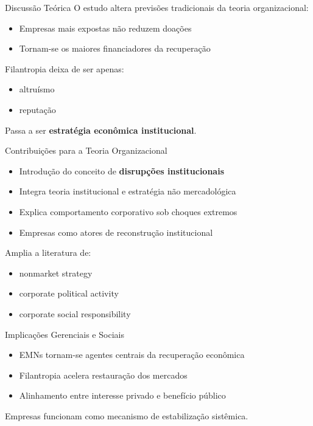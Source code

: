 \documentclass[
  10pt,
  ignorenonframetext,
  aspectratio=169,
  brazilian,
]{beamer}
\providecommand{\tightlist}{%
  \setlength{\itemsep}{0pt}\setlength{\parskip}{0pt}}
\begin{document}
\begin{frame}{Discussão Teórica}
\label{discussuxe3o-teuxf3rica}
O estudo altera previsões tradicionais da teoria organizacional:

\begin{itemize}
\tightlist
\item
  Empresas mais expostas não reduzem doações
\item
  Tornam-se os maiores financiadores da recuperação
\end{itemize}

Filantropia deixa de ser apenas:

\begin{itemize}
\tightlist
\item
  altruísmo
\item
  reputação
\end{itemize}

Passa a ser \textbf{estratégia econômica institucional}.
\end{frame}

\begin{frame}{Contribuições para a Teoria Organizacional}
\label{contribuiuxe7uxf5es-para-a-teoria-organizacional}
\begin{itemize}
\tightlist
\item
  Introdução do conceito de \textbf{disrupções institucionais}
\item
  Integra teoria institucional e estratégia não mercadológica
\item
  Explica comportamento corporativo sob choques extremos
\item
  Empresas como atores de reconstrução institucional
\end{itemize}

Amplia a literatura de:

\begin{itemize}
\tightlist
\item
  nonmarket strategy
\item
  corporate political activity
\item
  corporate social responsibility
\end{itemize}
\end{frame}

\begin{frame}{Implicações Gerenciais e Sociais}
\label{implicauxe7uxf5es-gerenciais-e-sociais}
\begin{itemize}
\tightlist
\item
  EMNs tornam-se agentes centrais da recuperação econômica
\item
  Filantropia acelera restauração dos mercados
\item
  Alinhamento entre interesse privado e benefício público
\end{itemize}

Empresas funcionam como mecanismo de estabilização sistêmica.
\end{frame}
\end{document}
